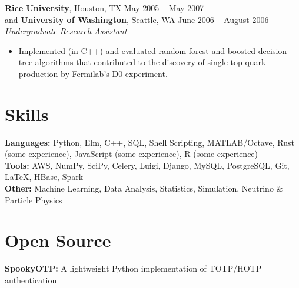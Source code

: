 \documentclass[margin,line]{resume}
\begin{document}
\begin{resume}
    \textbf{Rice University}, Houston, TX \hfill May 2005 -- May 2007 \vspace{1mm}\\\vspace{1mm}%
    and \textbf{University of Washington}, Seattle, WA \hfill June 2006 -- August 2006 \vspace{1mm}\\\vspace{1mm}%
    \textsl{Undergraduate Research Assistant}
    \begin{itemize}
    \item Implemented (in C++) and evaluated random forest and boosted decision tree algorithms that contributed to the discovery of single top quark production by Fermilab's D0 experiment.
    \end{itemize}
    
    \section{\mysidestyle Skills}\vspace{0mm}%
    \textbf{Languages:} Python, Elm, C++, SQL, Shell Scripting, MATLAB/Octave, Rust (some experience), JavaScript (some experience), R (some experience)
    \vspace{1mm}\\\vspace{0mm}%
    \textbf{Tools:} AWS, NumPy, SciPy, Celery, Luigi, Django, MySQL, PostgreSQL, Git, \LaTeX, HBase, Spark
    \vspace{1mm}\\\vspace{0mm}%
    \textbf{Other:} Machine Learning, Data Analysis, Statistics, Simulation, Neutrino \& Particle Physics

    \section{\mysidestyle Open Source}\vspace{0mm}%
    \textbf{SpookyOTP:} A lightweight Python implementation of TOTP/HOTP authentication
    \vspace{1mm}%
    

\end{resume}
\end{document}
